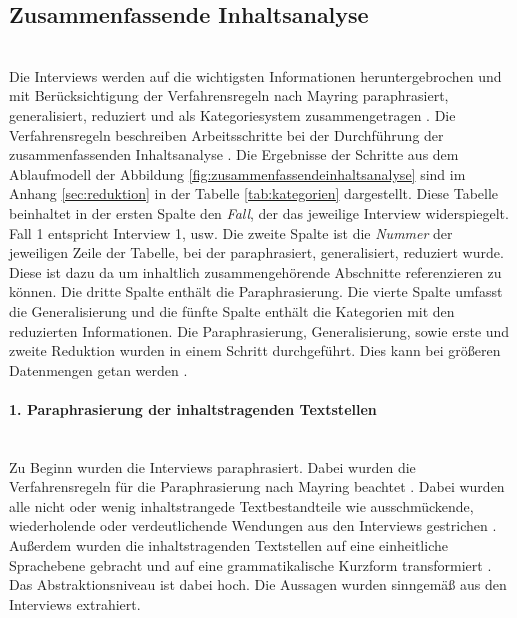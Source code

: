 %	
%	
%	
%	
\subsection{Zusammenfassende Inhaltsanalyse}\mbox{} \\
Die Interviews werden auf die wichtigsten Informationen heruntergebrochen und mit Berücksichtigung der Verfahrensregeln nach Mayring paraphrasiert, generalisiert, reduziert und als Kategoriesystem zusammengetragen \cite{mayring1994qualitative}. Die Verfahrensregeln beschreiben Arbeitsschritte bei der Durchführung der zusammenfassenden Inhaltsanalyse \cite{mayring1994qualitative}. Die Ergebnisse der Schritte aus dem Ablaufmodell der Abbildung \ref{fig:zusammenfassendeinhaltsanalyse} sind im Anhang \ref{sec:reduktion} in der Tabelle \ref{tab:kategorien} dargestellt. Diese Tabelle beinhaltet in der ersten Spalte den \emph{Fall}, der das jeweilige Interview widerspiegelt. Fall 1 entspricht Interview 1, usw. Die zweite Spalte ist die \emph{Nummer} der jeweiligen Zeile der Tabelle, bei der paraphrasiert, generalisiert, reduziert wurde. Diese ist dazu da um inhaltlich zusammengehörende Abschnitte referenzieren zu können. Die dritte Spalte enthält die Paraphrasierung. Die vierte Spalte umfasst die Generalisierung und die fünfte Spalte enthält die Kategorien mit den reduzierten Informationen. Die Paraphrasierung, Generalisierung, sowie erste und zweite Reduktion wurden in einem Schritt durchgeführt. Dies kann bei größeren Datenmengen getan werden \cite{mayring2019qualitative}.
\paragraph{1. Paraphrasierung der inhaltstragenden Textstellen}\mbox{} \\
Zu Beginn wurden die Interviews paraphrasiert. Dabei wurden die Verfahrensregeln für die Paraphrasierung nach Mayring beachtet \cite{mayring2019qualitative}. Dabei wurden alle nicht oder wenig inhaltstrangede Textbestandteile wie ausschmückende, wiederholende oder verdeutlichende Wendungen aus den Interviews gestrichen \cite{mayring2019qualitative}. Außerdem wurden die inhaltstragenden Textstellen auf eine einheitliche Sprachebene gebracht und auf eine grammatikalische Kurzform transformiert \cite{mayring2019qualitative}. Das Abstraktionsniveau ist dabei hoch. Die Aussagen wurden sinngemäß aus den Interviews extrahiert.\\
